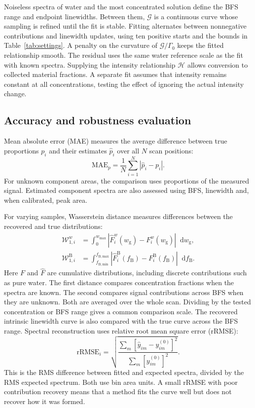 \documentclass[11pt]{article}
\newcommand{\wg}{w_{\mathrm g}}
\newcommand{\wmax}{w_{\max}}
\newcommand{\dd}{\mathop{}\!\mathrm{d}}
\begin{document}
Noiseless spectra of water and the most concentrated solution define the BFS range and endpoint linewidths. Between them, $\mathcal G$ is a continuous curve whose sampling is refined until the fit is stable. Fitting alternates between nonnegative contributions and linewidth updates, using ten positive starts and the bounds in Table~\ref{tab:settings}. A penalty on the curvature of $\mathcal G/\Gamma_0$ keeps the fitted relationship smooth. The residual uses the same water reference scale as the fit with known spectra. Supplying the intensity relationship $\mathcal H$ allows conversion to collected material fractions. A separate fit assumes that intensity remains constant at all concentrations, testing the effect of ignoring the actual intensity change.

\subsection{Accuracy and robustness evaluation}
\label{sec:evaluation}

Mean absolute error (MAE) measures the average difference between true proportions $p_i$ and their estimates $\widehat p_i$ over all $N$ scan positions:
\begin{equation}
 \mathrm{MAE}_p=\frac{1}{N}\sum_{i=1}^{N}|\widehat p_i-p_i|.
 \label{eq:proportion_mae}
\end{equation}
For unknown component areas, the comparison uses proportions of the measured signal. Estimated component spectra are also assessed using BFS, linewidth and, when calibrated, peak area.

For varying samples, Wasserstein distance measures differences between the recovered and true distributions:
\begin{align}
 \mathcal W_{1,i}^{w}&=\int_0^{\wmax}
 |\widehat F_i^w(\wg)-F_i^w(\wg)|\dd\wg,\\
 \mathcal W_{1,i}^{\mathrm B}&=\int_{f_{\mathrm{B,min}}}^{f_{\mathrm{B,max}}}
 |\widehat F_i^{\mathrm B}(f_{\mathrm B})-F_i^{\mathrm B}(f_{\mathrm B})|\dd f_{\mathrm B}.
 \label{eq:wasserstein}
\end{align}
Here $F$ and $\widehat F$ are cumulative distributions, including discrete contributions such as pure water. The first distance compares concentration fractions when the spectra are known. The second compares signal contributions across BFS when they are unknown. Both are averaged over the whole scan. Dividing by the tested concentration or BFS range gives a common comparison scale. The recovered intrinsic linewidth curve is also compared with the true curve across the BFS range. Spectral reconstruction uses relative root mean square error (rRMSE):
\begin{equation}
 \mathrm{rRMSE}_i=\sqrt{\frac{\sum_m[\widehat y_{im}-y_{im}^{(0)}]^2}
 {\sum_m[y_{im}^{(0)}]^2}}.
 \label{eq:spectral_nrmse}
\end{equation}
This is the RMS difference between fitted and expected spectra, divided by the RMS expected spectrum. Both use bin area units. A small rRMSE with poor contribution recovery means that a method fits the curve well but does not recover how it was formed.
\end{document}
